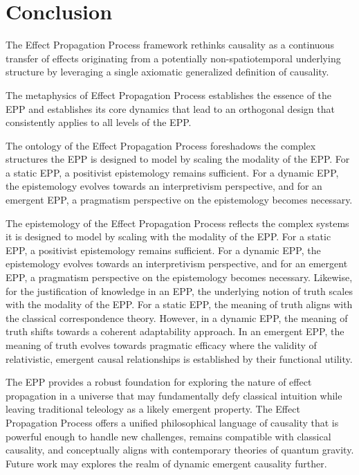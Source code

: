 \section{Conclusion}
\label{sec:conclusion}

The Effect Propagation Process framework rethinks causality as a continuous transfer of effects originating from a potentially non-spatiotemporal underlying structure by leveraging a single axiomatic generalized definition of causality.

The metaphysics of Effect Propagation Process establishes the essence of the EPP and establishes its core dynamics that lead to an orthogonal design that consistently applies to all levels of the EPP.

The ontology of the Effect Propagation Process foreshadows the complex structures the EPP is designed to model by scaling the modality of the EPP. For a static EPP, a positivist epistemology remains sufficient. For a dynamic EPP, the epistemology evolves towards an interpretivism perspective, and for an emergent EPP, a pragmatism perspective on the epistemology becomes necessary.

The epistemology of the Effect Propagation Process reflects the complex systems it is designed to model by scaling with the modality of the EPP. For a static EPP, a positivist epistemology remains sufficient. For a dynamic EPP, the epistemology evolves towards an interpretivism perspective, and for an emergent EPP, a pragmatism perspective on the epistemology becomes necessary. Likewise, for the justification of knowledge in an EPP, the underlying notion of truth scales with the modality of the EPP. For a static EPP, the meaning of truth aligns with the classical correspondence theory. However, in a dynamic EPP, the meaning of truth shifts towards a coherent adaptability approach. In an emergent EPP, the meaning of truth evolves towards pragmatic efficacy where the validity of relativistic, emergent causal relationships is established by their functional utility.

The EPP provides a robust foundation for exploring the nature of effect propagation in a universe that may fundamentally defy classical intuition while leaving traditional teleology as a likely emergent property. The Effect Propagation Process offers a unified philosophical language of causality that is powerful enough to handle new challenges, remains compatible with classical causality, and conceptually aligns with contemporary theories of quantum gravity. Future work may explores the realm of dynamic emergent causality further.


\newpage